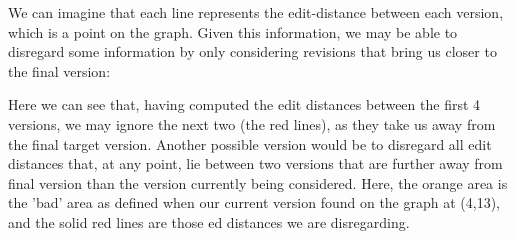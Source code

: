 \documentclass[a4paper,11pt,twoside,notitlepage]{article}
\begin{document}
        We can imagine that each line represents the edit-distance
        between each version, which is a point on the graph. Given
        this information, we may be able to disregard some information
        by only considering revisions that bring us closer to the
        final version:

        \begin{figure}[H]
          \centering
          \pgfplotsset{width=0.5\textwidth}
          \label{fig:dummy_optimisation_1}
        \end{figure}

        Here we can see that, having computed the edit distances
        between the first 4 versions, we may ignore the next two (the
        red lines), as they take us away from the final target
        version. Another possible version would be to disregard all
        edit distances that, at any point, lie between two versions
        that are further away from final version than the version
        currently being considered. Here, the orange area is the 'bad'
        area as defined when our current version found on the graph at
        (4,13), and the solid red lines are those ed distances we are
        disregarding.

        \begin{figure}[H]
          \centering
          \pgfplotsset{width=0.5\textwidth}
          \label{fig:dummy_optimisation_2}
        \end{figure}
        
\end{document}
